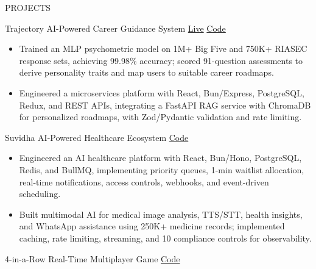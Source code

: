 \documentclass{resume} %
\begin{document}
\vspace{-2pt}


\begin{rSection}{PROJECTS}

\setlength{\parskip}{6pt}
\setlength{\parindent}{2pt}

\projectHeading
{Trajectory}
{AI-Powered Career Guidance System}
{\href{https://career-counselling-system.vercel.app/}{Live}}
{\href{https://github.com/Riyanshverma/career-counselling-system}{Code}}

\begin{itemize}
\itemsep -3pt {}

\item Trained an MLP psychometric model on 1M+ Big Five and 750K+ RIASEC response sets, achieving 99.98\% accuracy; scored 91-question assessments to derive personality traits and map users to suitable career roadmaps.

\item Engineered a microservices platform with React, Bun/Express, PostgreSQL, Redux, and REST APIs, integrating a FastAPI RAG service with ChromaDB for personalized roadmaps, with Zod/Pydantic validation and rate limiting.

\end{itemize}

\projectHeading
{Suvidha}
{AI-Powered Healthcare Ecosystem}
{}
{\href{https://github.com/Riyanshverma/suvidha}{Code}}

\begin{itemize}
\itemsep -3pt {}

\item Engineered an AI healthcare platform with React, Bun/Hono, PostgreSQL, Redis, and BullMQ, implementing priority queues, 1-min waitlist allocation, real-time notifications, access controls, webhooks, and event-driven scheduling.

\item Built multimodal AI for medical image analysis, TTS/STT, health insights, and WhatsApp assistance using 250K+ medicine records; implemented caching, rate limiting, streaming, and 10 compliance controls for observability.

\end{itemize}

\projectHeading
{4-in-a-Row}
{Real-Time Multiplayer Game}
{}
{\href{https://github.com/Riyanshverma/4-in-a-row}{Code}}


\end{rSection}
\end{document}
